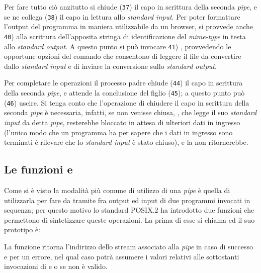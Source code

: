 Per fare tutto ciò anzitutto si chiude (\texttt{\small 37}) il capo in
scrittura della seconda \textit{pipe}, e se ne collega (\texttt{\small 38}) il
capo in lettura allo \textit{standard input}. Per poter formattare l'output
del programma in maniera utilizzabile da un browser, si provvede anche
\texttt{\small 40}) alla scrittura dell'apposita stringa di identificazione
del \textit{mime-type} in testa allo \textit{standard output}. A questo punto
si può invocare \texttt{\small 41}) , provvedendo le opportune opzioni
del comando che consentono di leggere il file da convertire dallo
\textit{standard input} e di inviare la conversione sullo \textit{standard
  output}.

Per completare le operazioni il processo padre chiude (\texttt{\small 44}) il
capo in scrittura della seconda \textit{pipe}, e attende la conclusione del
figlio (\texttt{\small 45}); a questo punto può (\texttt{\small 46})
uscire. Si tenga conto che l'operazione di chiudere il capo in scrittura della
seconda \textit{pipe} è necessaria, infatti, se non venisse chiusa, ,
che legge il suo \textit{standard input} da detta \textit{pipe}, resterebbe
bloccato in attesa di ulteriori dati in ingresso (l'unico modo che un
programma ha per sapere che i dati in ingresso sono terminati è rilevare che
lo \textit{standard input} è stato chiuso), e la  non ritornerebbe.


\subsection{Le funzioni  e }
\label{sec:ipc_popen}

Come si è visto la modalità più comune di utilizzo di una \textit{pipe} è
quella di utilizzarla per fare da tramite fra output ed input di due programmi
invocati in sequenza; per questo motivo lo standard POSIX.2 ha introdotto due
funzioni che permettono di sintetizzare queste operazioni. La prima di esse si
chiama  ed il suo prototipo è:


\begin{funcproto}{
}

{La funzione ritorna l'indirizzo dello stream associato alla \textit{pipe} in
  caso di successo e  per un errore, nel qual caso  potrà
  assumere i valori relativi alle sottostanti invocazioni di  e
   o  se  non è valido.}
\end{funcproto}

